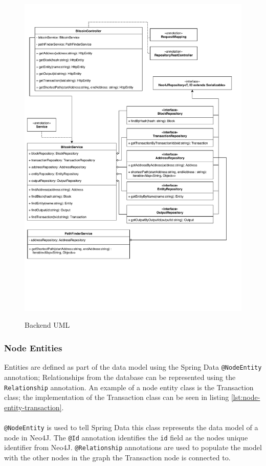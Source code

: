 \begin{figure}
  \centering
  \includegraphics[width = 15cm]{./figures/backend-uml}\\[0.5cm] 
  \caption{Backend UML}
  \label{fig:backend-uml}
\end{figure}

\subsubsection{Node Entities}
Entities are defined as part of the data model using the Spring Data \texttt{@NodeEntity} annotation; Relationships from the database can be represented using the \texttt{Relationship} annotation. An example of a node entity class is the Transaction class; the implementation of the Transaction class can be seen in listing \ref{lst:node-entity-transaction}.
\\\\
\texttt{@NodeEntity} is used to tell Spring Data this class represents the data model of a node in Neo4J. The \texttt{@Id} annotation identifies the \texttt{id} field as the nodes unique identifier from Neo4J. \texttt{@Relationship} annotations are used to populate the model with the other nodes in the graph the Transaction node is connected to. 

